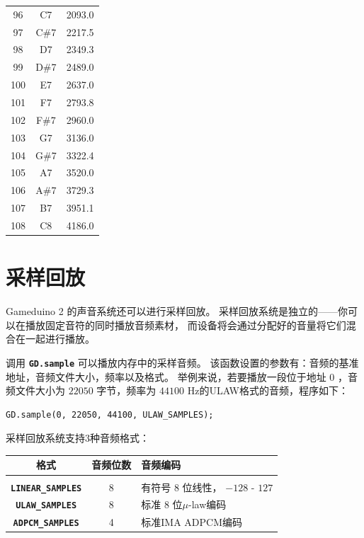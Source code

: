 \documentclass[10pt]{book}
\newcommand{\gdtwo}{Gameduino 2 }
\newcommand{\mach}[1]{\texttt{\textbf{#1}}}
\begin{document}
\begin{CJK}{UTF8}{gkai}
\begin{spacing}{0.99}
\begin{supertabular}{ccc}
96  & C7  & 2093.0 \\
97  & C\#7 & 2217.5 \\
98  & D7  & 2349.3 \\
99  & D\#7 & 2489.0 \\
100 & E7  & 2637.0 \\
101 & F7  & 2793.8 \\
102 & F\#7 & 2960.0 \\
103 & G7  & 3136.0 \\
104 & G\#7 & 3322.4 \\
105 & A7  & 3520.0 \\
106 & A\#7 & 3729.3 \\
107 & B7  & 3951.1 \\
108 & C8  & 4186.0 \\
\end{supertabular}
\end{spacing}
\onecolumn
\normalsize

\section{采样回放}

\gdtwo 的声音系统还可以进行采样回放。
采样回放系统是独立的——你可以在播放固定音符的同时播放音频素材，
而设备将会通过分配好的音量将它们混合在一起进行播放。

调用 \mach{GD.sample} 可以播放内存中的采样音频。 该函数设置的参数有：音频的基准地址，音频文件大小，频率以及格式。
举例来说，若要播放一段位于地址 $0$ ，音频文件大小为 $22050$ 字节，频率为 $44100$ Hz的ULAW格式的音频，程序如下：

\begin{framed}
\begin{verbatim}
GD.sample(0, 22050, 44100, ULAW_SAMPLES);
\end{verbatim}
\end{framed}

采样回放系统支持3种音频格式：

\vspace{10pt}
\begin{tabular}{ccl}
格式 & 音频位数 & 音频编码 \\
\hline \\
\mach{LINEAR\_SAMPLES} & 8 & 有符号 $8$ 位线性， $-128$ - $127$ \\
\mach{ULAW\_SAMPLES} & 8 & 标准 $8$ 位$\mu$-law编码 \\
\mach{ADPCM\_SAMPLES} & 4 & 标准IMA ADPCM编码 \\
\end{tabular}
\vspace{10pt}


\end{CJK}
\end{document}
